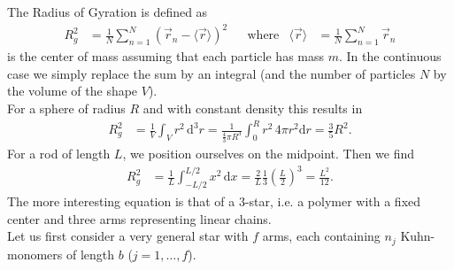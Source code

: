 \documentclass[english, parskip=full]{scrartcl}
\title{\titel}
\author{\autor}
\date{\today}
\renewcommand{\bra}{}
\newcommand{\intx}{}
\newcommand{\kla}{}
\newcommand{\tecxt}{}
\begin{document}
\maketitle  %


The Radius of Gyration is defined as
\begin{align}
R_g^2 &= \frac{1}{N} \sum_{n=1}^N \kla\left( \vec{r}_n - \bra\langle \vec{r} \rangle \right)^2 && \tecxt\text{where} & \bra\langle \vec{r} \rangle &= \frac{1}{N} \sum_{n=1}^N \vec{r}_n
\end{align}
is the center of mass assuming that each particle has mass $m$.
In the continuous case we simply replace the sum by an integral (and the number of particles $N$ by the volume of the shape $V$).
\\
For a sphere of radius $R$ and with constant density this results in
\begin{align}
R_g^2 &= \frac{1}{V} \intx\int_{V}^{ } r^2\, \mathrm{d}^3r = \frac{1}{\frac{4}{3}\pi R^3} \intx\int_{0}^{R} r^2 \, 4\pi r^2\mathrm{d}r = \frac{3}{5} R^2.
\end{align}
For a rod of length $L$, we position ourselves on the midpoint.
Then we find
\begin{align}
R_g^2 &= \frac{1}{L} \intx\int_{-L/2}^{L/2} x^2 \, \mathrm{d}x = \frac{2}{L} \frac{1}{3} \kla\left( \frac{L}{2} \right)^3 = \frac{L^2}{12}.
\end{align}
The more interesting equation is that of a 3-star, i.e. a polymer with a fixed center and three arms representing linear chains.
\\
Let us first consider a very general star with $f$ arms, each containing $n_j$ Kuhn-monomers of length $b$ ($j=1,\dots,f$).
\end{document}
